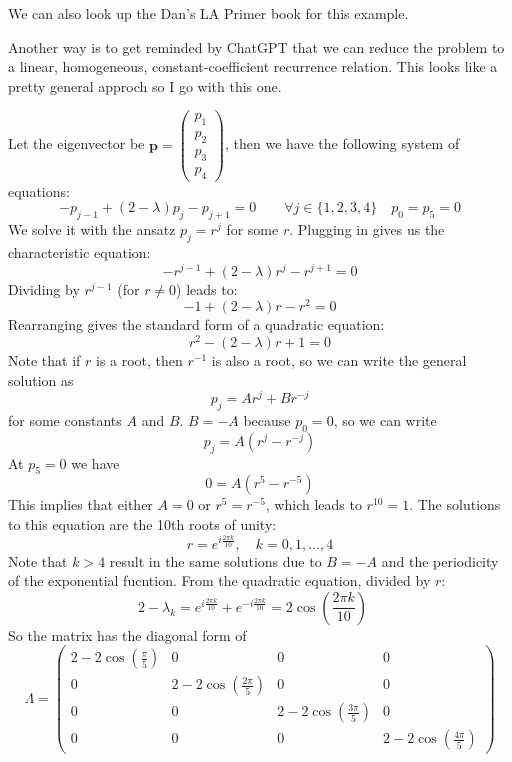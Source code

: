 \documentclass{article}
\begin{document}
We can also look up the Dan's LA Primer book for this example.

Another way is to get reminded by ChatGPT that we can reduce the problem to a linear, homogeneous, constant-coefficient recurrence relation. This looks like a pretty general approch so I go with this one.

Let the eigenvector be $\mathbf{p} = \begin{pmatrix} p_1 \\ p_2 \\ p_3 \\ p_4 \end{pmatrix}$, then we have the following system of equations:
\[ - {p_{j - 1}} + \left( {2 - \lambda } \right){p_j} - {p_{j + 1}} = 0\qquad \forall j \in \{ 1,2,3,4\} \quad {p_0} = {p_5} = 0\]
We solve it with the ansatz $p_j = r^j$ for some $r$. Plugging in gives us the characteristic equation:
\[ - r^{j-1} + (2 - \lambda) r^j - r^{j+1} = 0 \]
Dividing by $r^{j-1}$ (for $r \neq 0$) leads to:
\[ - 1 + (2 - \lambda) r - r^2 = 0 \]
Rearranging gives the standard form of a quadratic equation:
\[ r^2 - (2 - \lambda) r + 1 = 0 \]
Note that if $r$ is a root, then $r^{-1}$ is also a root, so we can write the general solution as
\[ p_j = A r^j + B r^{-j} \]
for some constants $A$ and $B$. $B=-A$ because $p_0 = 0$, so we can write
\[ p_j = A \left( r^j - r^{-j} \right) \]
At $p_5  =0$ we have
\[ 0 = A \left( r^5 - r^{-5} \right) \]
This implies that either $A = 0$ or $r^5 = r^{-5}$, which leads to $r^{10} = 1$. The solutions to this equation are the 10th roots of unity:
\[ r = e^{i\frac{2\pi k}{10}}, \quad k = 0, 1, \ldots, 4 \]
Note that $k>4$ result in the same solutions due to $B=-A$ and the periodicity of the exponential fucntion. From the quadratic equation, divided by $r$:
\[2-\lambda_k = e^{i\frac{2\pi k}{10}} + e^{-i\frac{2\pi k}{10}} = 2 \cos\left(\frac{2\pi k}{10}\right)\quad \]
So the matrix has the diagonal form of
\[
    \Lambda = \begin{pmatrix}
        2 - 2\cos\left(\frac{\pi}{5}\right) & 0                                    & 0                                    & 0                                    \\
        0                                   & 2 - 2\cos\left(\frac{2\pi}{5}\right) & 0                                    & 0                                    \\
        0                                   & 0                                    & 2 - 2\cos\left(\frac{3\pi}{5}\right) & 0                                    \\
        0                                   & 0                                    & 0                                    & 2 - 2\cos\left(\frac{4\pi}{5}\right)
    \end{pmatrix}
\]
\end{document}
